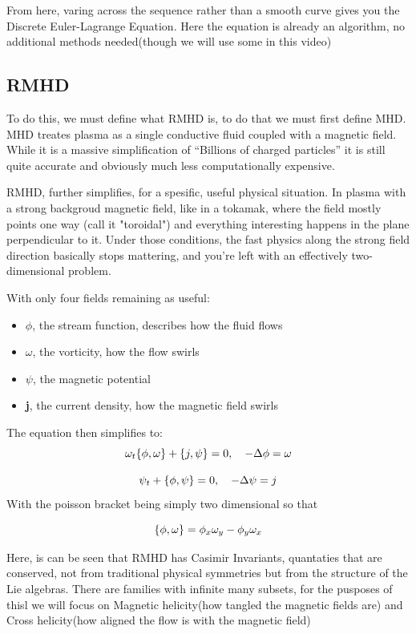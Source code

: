 From here, varing across the sequence rather than a smooth curve gives you the Discrete Euler-Lagrange Equation. Here the equation is already an algorithm, no additional methods needed(though we will use some in this video)
\subsection{RMHD}

To do this, we must define what RMHD is, to do that we must first define MHD. MHD treates plasma as a single conductive fluid coupled with a magnetic field. While it is a massive simplification of ``Billions of charged particles'' it is still quite accurate and obviously much less computationally expensive.

RMHD, further simplifies, for a spesific, useful physical situation. In plasma with a strong backgroud magnetic field, like in a tokamak, where the field mostly points one way (call it "toroidal") and everything interesting happens in the plane perpendicular to it. Under those conditions, the fast physics along the strong field direction basically stops mattering, and you're left with an effectively two-dimensional problem.

With only four fields remaining as useful:
\begin{itemize}
	\item $\phi$, the stream function, describes how the fluid flows
	\item $\omega$, the vorticity, how the flow swirls
	\item $\psi$, the magnetic potential
	\item \textbf{j}, the current density, how the magnetic field swirls
\end{itemize}

The equation then simplifies to:
\[
	\omega_t \pb{\phi}{\omega} + \pb{j}{\psi} = 0, \quad - \Delta \phi = \omega
\]

\[
	\psi_t + \pb{\phi}{\psi}= 0, \quad - \Delta \psi = j
\]
With the poisson bracket being simply two dimensional so that

\[
	\pb{\phi}{\omega} = \phi_x \omega_y - \phi_y \omega_x
\]

Here, is can be seen that RMHD has Casimir Invariants, quantaties that are conserved, not from traditional physical symmetries but from the structure of the Lie algebras. There are families with infinite many subsets, for the pusposes of thisl we will focus on Magnetic helicity(how tangled the magnetic fields are) and Cross helicity(how aligned the flow is with the magnetic field)


